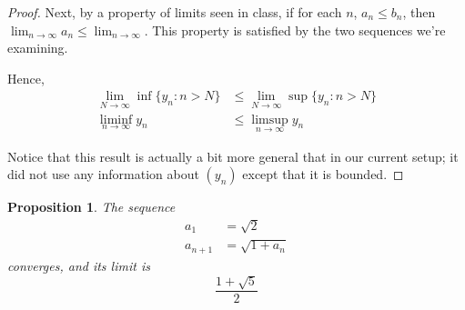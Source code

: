 \documentclass[11pt,letterpaper]{article}
\newtheorem{prop}{Proposition}
\begin{document}
\begin{proof}
  Next, by a property of limits seen in class, if for each $n$, $a_n \leq b_n$,
  then $\lim_{n\to\infty} a_n \leq \lim_{n\to\infty}$. This property is
  satisfied by the two sequences we're examining.

  Hence,
  \begin{align*}
    \lim_{N\to\infty} \inf \{ y_n : n > N \} &\leq
    \lim_{N\to\infty} \sup \{ y_n : n > N \} \\
    \liminf_{n\to\infty} y_n &\leq \limsup_{n\to\infty} y_n
  \end{align*}

  Notice that this result is actually a bit more general that in our current
  setup; it did not use any information about $(y_n)$ except that it is
  bounded.
\end{proof}

\begin{prop}
  The sequence
  \begin{align*}
    a_1 &= \sqrt{2} \\
    a_{n+1} &= \sqrt{1 + a_n}
  \end{align*}
  converges, and its limit is
  \begin{equation*}
    \frac{1 + \sqrt{5}}{2}
  \end{equation*}
\end{prop}
\end{document}
